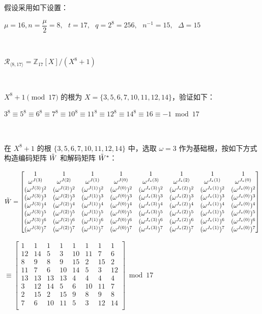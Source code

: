 假设采用如下设置：

$\mu = 16, n = \dfrac{\mu}{2} = 8, \text{ } t = 17, \text{ } q = 2^8 = 256, \text{ } n^{-1} = 15, \text{ } \Delta = 15$

$ $

$\mathcal{R}_{\langle 8, 17 \rangle} = \mathbb{Z}_{17}[X] / (X^8 + 1)$

$ $

$X^8 + 1 \pmod{17}$ 的根为 $X = \{3, 5, 6, 7, 10, 11, 12, 14\}$，验证如下：

$3^8 \equiv 5^8 \equiv 6^8 \equiv 7^8 \equiv 10^8 \equiv 11^8 \equiv 12^8 \equiv 14^8 \equiv 16 \equiv -1 \bmod{17}$


$ $

在 $X^8 + 1$ 的根 $\{3, 5, 6, 7, 10, 11, 12, 14\}$ 中，选取 $\omega = 3$ 作为基础根，按如下方式构造编码矩阵 $\tilde{W}$ 和解码矩阵 $\tilde{W}^*$：

$\tilde{W} = \begin{bmatrix}
1 & 1 & 1 & 1 & 1 & 1 & 1 & 1\\
\omega^{J(3)} & \omega^{J(2)} & \omega^{J(1)} & \omega^{J(0)} & \omega^{J_*(3)} & \omega^{J_*(2)} & \omega^{J_*(1)} & \omega^{J_*(0)}\\
(\omega^{J(3)})^2 & (\omega^{J(2)})^2 & (\omega^{J(1)})^2 & (\omega^{J(0)})^2 & (\omega^{J_*(3)})^2 & (\omega^{J_*(2)})^2 & (\omega^{J_*(1)})^2 & (\omega^{J_*(0)})^2\\
(\omega^{J(3)})^3 & (\omega^{J(2)})^3 & (\omega^{J(1)})^3 & (\omega^{J(0)})^3 & (\omega^{J_*(3)})^3 & (\omega^{J_*(2)})^3 & (\omega^{J_*(1)})^3 & (\omega^{J_*(0)})^3\\
(\omega^{J(3)})^4 & (\omega^{J(2)})^4 & (\omega^{J(1)})^4 & (\omega^{J(0)})^4 & (\omega^{J_*(3)})^4 & (\omega^{J_*(2)})^4 & (\omega^{J_*(1)})^4 & (\omega^{J_*(0)})^4\\
(\omega^{J(3)})^5 & (\omega^{J(2)})^5 & (\omega^{J(1)})^5 & (\omega^{J(0)})^5 & (\omega^{J_*(3)})^5 & (\omega^{J_*(2)})^5 & (\omega^{J_*(1)})^5 & (\omega^{J_*(0)})^5\\
(\omega^{J(3)})^6 & (\omega^{J(2)})^6 & (\omega^{J(1)})^6 & (\omega^{J(0)})^6 & (\omega^{J_*(3)})^6 & (\omega^{J_*(2)})^6 & (\omega^{J_*(1)})^6 & (\omega^{J_*(0)})^6\\
(\omega^{J(3)})^7 & (\omega^{J(2)})^7 & (\omega^{J(1)})^7 & (\omega^{J(0)})^7 & (\omega^{J_*(3)})^7 & (\omega^{J_*(2)})^7 & (\omega^{J_*(1)})^7 & (\omega^{J_*(0)})^7\\
\end{bmatrix}$ 

$ \equiv \begin{bmatrix}
1 & 1 & 1 & 1 & 1 & 1 & 1 & 1\\
12&14&5&3&10&11&7&6\\
8&9&8&9&15&2&15&2\\
11&7&6&10&14&5&3&12\\
13&13&13&13&4&4&4&4\\
3&12&14&5&6&10&11&7\\
2&15&2&15&9&8&9&8\\
7&6&10&11&5&3&12&14\\
\end{bmatrix} \bmod{17}$ 

